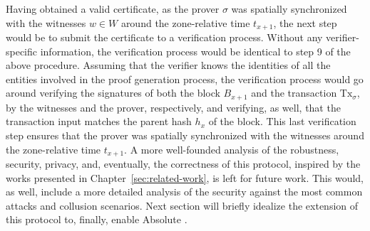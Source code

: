 Having obtained a valid \pol{} certificate, as the prover $\sigma$ was spatially synchronized with the witnesses $w \in W$ around the zone-relative time $t_{x+1}$, the next step would be to submit the certificate to a verification process. Without any verifier-specific information, the verification process would be identical to step 9 of the above procedure. Assuming that the verifier knows the identities of all the entities involved in the proof generation process, the verification process would go around verifying the signatures of both the block $B_{x+1}$ and the transaction $\text{Tx}_\sigma$, by the witnesses and the prover, respectively, and verifying, as well, that the transaction input matches the parent hash $h_{x}$ of the block. This last verification step ensures that the prover was spatially synchronized with the witnesses around the zone-relative time $t_{x+1}$. A more well-founded analysis of the robustness, security, privacy, and, eventually, the correctness of this \pol{} protocol, inspired by the works presented in Chapter~\ref{sec:related-work}, is left for future work. This would, as well, include a more detailed analysis of the security against the most common attacks and collusion scenarios.
Next section will briefly idealize the extension of this protocol to, finally, enable Absolute \pol{}.